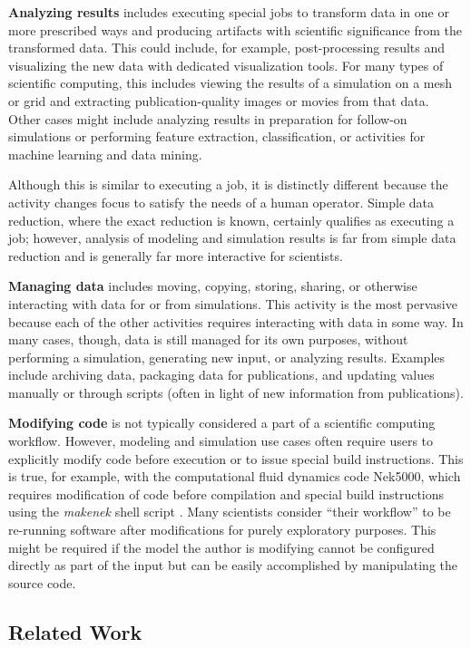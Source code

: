 \textbf{Analyzing results} includes executing special jobs to transform
data in one or more prescribed ways and producing artifacts with
scientific significance from the transformed data. This could include, for
example, post-processing results and visualizing the new data with
dedicated visualization tools. For many types of scientific computing,
this includes viewing the results of a simulation on a mesh or grid and
extracting publication-quality images or movies from that data. Other
cases might include analyzing results in preparation for follow-on
simulations or performing feature extraction, classification, or
activities for machine learning and data mining.

Although this is similar to executing a job, it is distinctly
different because the activity changes focus to satisfy the needs of a
human operator. Simple data reduction, where the exact reduction is
known, certainly qualifies as executing a job; however, analysis of
modeling and simulation results is far from simple data reduction and is
generally far more interactive for scientists.

\textbf{Managing data} includes moving, copying, storing, sharing, or
otherwise interacting with data for or from simulations. This activity
is the most pervasive because each of the other activities requires
interacting with data in some way. In many cases, though, data is still
managed for its own purposes, without performing a simulation,
generating new input, or analyzing results. Examples include archiving
data, packaging data for publications, and updating values manually or through
scripts (often in light of new information from publications).

\textbf{Modifying code} is not typically considered a part of a
scientific computing workflow. However, modeling and simulation use
cases often require users to explicitly modify code before execution or to
issue special build instructions. This is true, for example, with the
computational fluid dynamics code Nek5000, which requires modification of code
before compilation and special build instructions using the \textit{makenek}
shell script \cite{the_nek5000_team_nek5000_2014}.
Many scientists consider ``their workflow'' to be re-running
software after modifications for purely exploratory purposes. This might
be required if the model the author is modifying cannot be
configured directly as part of the input but can be easily accomplished by
manipulating the source code.

\subsection{Related Work}\label{comparison-to-other-models}

